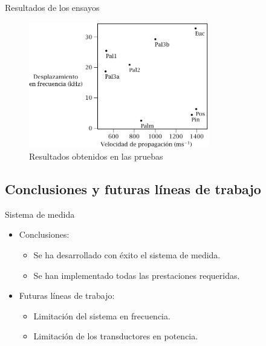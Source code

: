 \documentclass[utf8, compress]			{beamer}
\begin{document}
\begin{frame}{Resultados de los ensayos}
    \begin{figure}
	\includegraphics[height=55mm, keepaspectratio]{resultados.pdf}
	\caption{Resultados obtenidos en las pruebas}
	\label{fig:results}
    \end{figure}
\end{frame}


\subsection{Conclusiones y futuras líneas de trabajo}

\begin{frame}{Sistema de medida}
    \begin{itemize}
	\item Conclusiones:
	    \begin{itemize}
		\item Se ha desarrollado con éxito el sistema de medida.
		\item Se han implementado todas las prestaciones
		    requeridas.
	    \end{itemize}
	    \vspace{1ex}
	\item Futuras líneas de trabajo:
	    \begin{itemize}
		\item Limitación del sistema en frecuencia.
		\item Limitación de los transductores en potencia.
	    \end{itemize}
    \end{itemize}
\end{frame}
\end{document}
